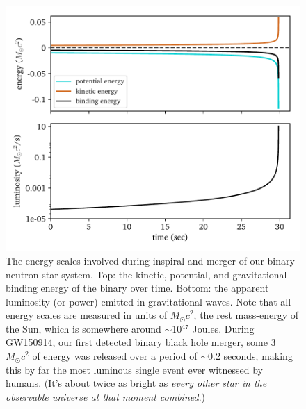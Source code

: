 \documentclass[11pt]{article}
\begin{document}
\begin{enumerate}
\begin{figure}[!h]
\centering
\includegraphics[scale=1]{inspiral/inspiral_energies.pdf}
\caption{\label{fig:inspiral_energy} The energy scales involved during inspiral and merger of our binary neutron star system. Top: the kinetic, potential, and gravitational binding energy of the binary over time. Bottom: the apparent luminosity (or power) emitted in gravitational waves. Note that all energy scales are measured in units of $M_{\odot}c^2$, the rest mass-energy of the Sun, which is somewhere around $\sim$10$^{47}$ Joules. During GW150914, our first detected binary black hole merger, some 3 $M_{\odot}c^2$ of energy was released over a period of $\sim$0.2 seconds, making this by far the most luminous single event ever witnessed by humans. (It's about twice as bright as \emph{every other star in the observable universe at that moment combined}.)}
\end{figure}


\end{enumerate}
\end{document}
